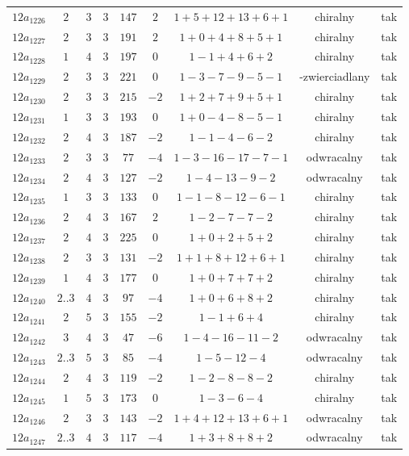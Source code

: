 \begin{longtable}{ccccccccc}
$12a_{1226}$ & $2$ & $3$ & $3$ & $147$ & $2$ & $1+5+12+13+6+1$ & chiralny & tak \\
$12a_{1227}$ & $2$ & $3$ & $3$ & $191$ & $2$ & $1+0+4+8+5+1$ & chiralny & tak \\
$12a_{1228}$ & $1$ & $4$ & $3$ & $197$ & $0$ & $1-1+4+6+2$ & chiralny & tak \\
$12a_{1229}$ & $2$ & $3$ & $3$ & $221$ & $0$ & $1-3-7-9-5-1$ & -zwierciadlany & tak \\
$12a_{1230}$ & $2$ & $3$ & $3$ & $215$ & $-2$ & $1+2+7+9+5+1$ & chiralny & tak \\
$12a_{1231}$ & $1$ & $3$ & $3$ & $193$ & $0$ & $1+0-4-8-5-1$ & chiralny & tak \\
$12a_{1232}$ & $2$ & $4$ & $3$ & $187$ & $-2$ & $1-1-4-6-2$ & chiralny & tak \\
$12a_{1233}$ & $2$ & $3$ & $3$ & $77$ & $-4$ & $1-3-16-17-7-1$ & odwracalny & tak \\
$12a_{1234}$ & $2$ & $4$ & $3$ & $127$ & $-2$ & $1-4-13-9-2$ & odwracalny & tak \\
$12a_{1235}$ & $1$ & $3$ & $3$ & $133$ & $0$ & $1-1-8-12-6-1$ & chiralny & tak \\
$12a_{1236}$ & $2$ & $4$ & $3$ & $167$ & $2$ & $1-2-7-7-2$ & chiralny & tak \\
$12a_{1237}$ & $2$ & $4$ & $3$ & $225$ & $0$ & $1+0+2+5+2$ & chiralny & tak \\
$12a_{1238}$ & $2$ & $3$ & $3$ & $131$ & $-2$ & $1+1+8+12+6+1$ & chiralny & tak \\
$12a_{1239}$ & $1$ & $4$ & $3$ & $177$ & $0$ & $1+0+7+7+2$ & chiralny & tak \\
$12a_{1240}$ & $2..3$ & $4$ & $3$ & $97$ & $-4$ & $1+0+6+8+2$ & chiralny & tak \\
$12a_{1241}$ & $2$ & $5$ & $3$ & $155$ & $-2$ & $1-1+6+4$ & chiralny & tak \\
$12a_{1242}$ & $3$ & $4$ & $3$ & $47$ & $-6$ & $1-4-16-11-2$ & odwracalny & tak \\
$12a_{1243}$ & $2..3$ & $5$ & $3$ & $85$ & $-4$ & $1-5-12-4$ & odwracalny & tak \\
$12a_{1244}$ & $2$ & $4$ & $3$ & $119$ & $-2$ & $1-2-8-8-2$ & chiralny & tak \\
$12a_{1245}$ & $1$ & $5$ & $3$ & $173$ & $0$ & $1-3-6-4$ & chiralny & tak \\
$12a_{1246}$ & $2$ & $3$ & $3$ & $143$ & $-2$ & $1+4+12+13+6+1$ & odwracalny & tak \\
$12a_{1247}$ & $2..3$ & $4$ & $3$ & $117$ & $-4$ & $1+3+8+8+2$ & odwracalny & tak \\

\end{longtable}
